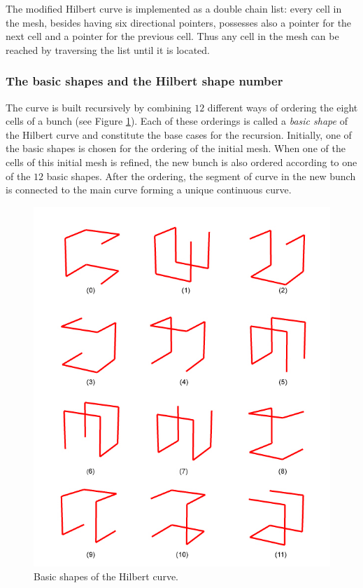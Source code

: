 The modified Hilbert curve is implemented as a double chain list:
every cell in the mesh, besides having six directional pointers,
possesses also a pointer for the next cell and a pointer for the
previous cell. Thus any cell in the mesh can be reached by
traversing the list until it is located.

\subsubsection{The basic shapes and the Hilbert shape number}
The curve is built recursively by combining $12$ different ways of
ordering the eight cells of a bunch (see Figure
\ref{FIG_BASIC_SHAPES}). Each of these orderings is called a
\textit{basic shape} of the Hilbert curve and constitute the base
cases for the recursion. Initially, one of the basic shapes is
chosen for the ordering of the initial mesh. When one of the cells
of this initial mesh is refined, the new bunch is also ordered
according to one of the $12$ basic shapes. After the ordering, the
segment of curve in the new bunch is connected to the main curve
forming a unique continuous curve.

\begin{figure}[H]
\centering
    \includegraphics[scale=0.4]{../img/basicShapes.jpg}
    \caption{Basic shapes of the Hilbert curve.}
    \label{FIG_BASIC_SHAPES}
\end{figure}

